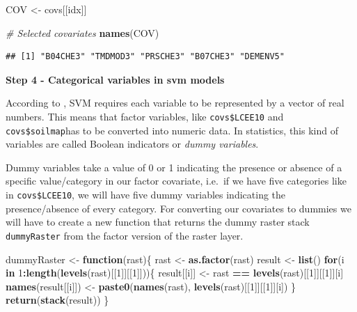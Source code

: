 \documentclass[10pt,b5paper,]{book}
\newenvironment{Shaded}{\begin{snugshade}}{\end{snugshade}}
\newcommand{\CommentTok}[1]{\textcolor[rgb]{0.56,0.35,0.01}{\textit{#1}}}
\newcommand{\ControlFlowTok}[1]{\textcolor[rgb]{0.13,0.29,0.53}{\textbf{#1}}}
\newcommand{\DecValTok}[1]{\textcolor[rgb]{0.00,0.00,0.81}{#1}}
\newcommand{\KeywordTok}[1]{\textcolor[rgb]{0.13,0.29,0.53}{\textbf{#1}}}
\newcommand{\NormalTok}[1]{#1}
\newcommand{\OperatorTok}[1]{\textcolor[rgb]{0.81,0.36,0.00}{\textbf{#1}}}
\newcommand{\StringTok}[1]{\textcolor[rgb]{0.31,0.60,0.02}{#1}}
\theoremstyle{definition}
\theoremstyle{definition}
\theoremstyle{definition}
\theoremstyle{remark}
\begin{document}
\begin{Shaded}
\begin{Highlighting}[]
\NormalTok{COV <-}\StringTok{ }\NormalTok{covs[[idx]]}

\CommentTok{# Selected covariates}
\KeywordTok{names}\NormalTok{(COV)}
\end{Highlighting}
\end{Shaded}

\begin{verbatim}
## [1] "B04CHE3" "TMDMOD3" "PRSCHE3" "B07CHE3" "DEMENV5"
\end{verbatim}

\textbf{Step 4 - Categorical variables in svm models}

According to \citet{hsu2003practical}, SVM requires each variable to be
represented by a vector of real numbers. This means that factor
variables, like \texttt{covs\$LCEE10} and \texttt{covs\$soilmap}has to
be converted into numeric data. In statistics, this kind of variables
are called Boolean indicators or \emph{dummy variables}.

Dummy variables take a value of 0 or 1 indicating the presence or
absence of a specific value/category in our factor covariate, i.e.~if we
have five categories like in \texttt{covs\$LCEE10}, we will have five
dummy variables indicating the presence/absence of every category. For
converting our covariates to dummies we will have to create a new
function that returns the dummy raster stack \texttt{dummyRaster} from
the factor version of the raster layer.

\begin{Shaded}
\begin{Highlighting}[]
\NormalTok{dummyRaster <-}\StringTok{ }\ControlFlowTok{function}\NormalTok{(rast)\{}
\NormalTok{  rast <-}\StringTok{ }\KeywordTok{as.factor}\NormalTok{(rast)}
\NormalTok{  result <-}\StringTok{ }\KeywordTok{list}\NormalTok{()}
  \ControlFlowTok{for}\NormalTok{(i }\ControlFlowTok{in} \DecValTok{1}\OperatorTok{:}\KeywordTok{length}\NormalTok{(}\KeywordTok{levels}\NormalTok{(rast)[[}\DecValTok{1}\NormalTok{]][[}\DecValTok{1}\NormalTok{]]))\{}
\NormalTok{    result[[i]] <-}\StringTok{ }\NormalTok{rast }\OperatorTok{==}\StringTok{ }\KeywordTok{levels}\NormalTok{(rast)[[}\DecValTok{1}\NormalTok{]][[}\DecValTok{1}\NormalTok{]][i]}
    \KeywordTok{names}\NormalTok{(result[[i]]) <-}\StringTok{ }\KeywordTok{paste0}\NormalTok{(}\KeywordTok{names}\NormalTok{(rast), }
                                 \KeywordTok{levels}\NormalTok{(rast)[[}\DecValTok{1}\NormalTok{]][[}\DecValTok{1}\NormalTok{]][i])}
\NormalTok{  \}}
  \KeywordTok{return}\NormalTok{(}\KeywordTok{stack}\NormalTok{(result))}
\NormalTok{\}}
\end{Highlighting}
\end{Shaded}
\end{document}
